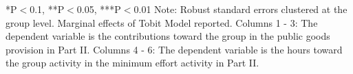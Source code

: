 \begin{table}[htbp]
\begin{tabular}{c c c c c c c}
\end{tabular}

\begin{footnotesize}
\newline
*P$<$0.1, **P$<$0.05, ***P$<$0.01
\newline
Note: Robust standard errors clustered at the group level. Marginal effects of Tobit Model reported. 
\newline
Columns 1 - 3: The dependent variable is the contributions toward the group in the public goods provision in Part II. 
\newline
Columns 4 - 6: The dependent variable is the hours toward the group activity in the minimum effort activity in Part II.
\end{footnotesize}
\end{table}